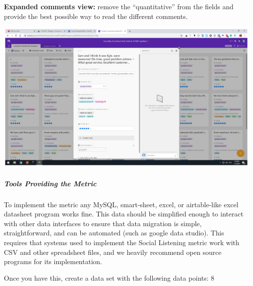 \textbf{Expanded comments view:} remove the ``quantitative'' from the
fields and provide the best possible way to read the different comments.

\includegraphics{images/social-listening_expanded-comment.png}

\hypertarget{tools-providing-the-metric}{%
\subparagraph{Tools Providing the
Metric}\label{tools-providing-the-metric}}

To implement the metric any MySQL, smart-sheet, excel, or airtable-like
excel datasheet program works fine. This data should be simplified
enough to interact with other data interfaces to ensure that data
migration is simple, straightforward, and can be automated (such as
google data studio). This requires that systems used to implement the
Social Listening metric work with CSV and other spreadsheet files, and
we heavily recommend open source programs for its implementation.

Once you have this, create a data set with the following data points: 8

